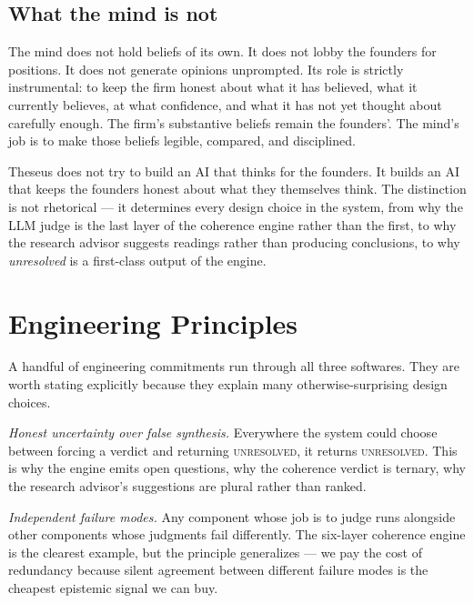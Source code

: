\documentclass[11pt]{article}
\begin{document}
\subsection{What the mind is not}

The mind does not hold beliefs of its own. It does not lobby the founders for positions. It does not generate opinions unprompted. Its role is strictly instrumental: to keep the firm honest about what it has believed, what it currently believes, at what confidence, and what it has not yet thought about carefully enough. The firm's substantive beliefs remain the founders'. The mind's job is to make those beliefs legible, compared, and disciplined.

\begin{intuitionbox}
Theseus does not try to build an AI that thinks for the founders. It builds an AI that keeps the founders honest about what they themselves think. The distinction is not rhetorical --- it determines every design choice in the system, from why the LLM judge is the last layer of the coherence engine rather than the first, to why the research advisor suggests readings rather than producing conclusions, to why \emph{unresolved} is a first-class output of the engine.
\end{intuitionbox}

\clearpage

\section{Engineering Principles}

A handful of engineering commitments run through all three softwares. They are worth stating explicitly because they explain many otherwise-surprising design choices.

\textit{Honest uncertainty over false synthesis.} Everywhere the system could choose between forcing a verdict and returning \textsc{unresolved}, it returns \textsc{unresolved}. This is why the engine emits open questions, why the coherence verdict is ternary, why the research advisor's suggestions are plural rather than ranked.

\textit{Independent failure modes.} Any component whose job is to judge runs alongside other components whose judgments fail differently. The six-layer coherence engine is the clearest example, but the principle generalizes --- we pay the cost of redundancy because silent agreement between different failure modes is the cheapest epistemic signal we can buy.
\end{document}
